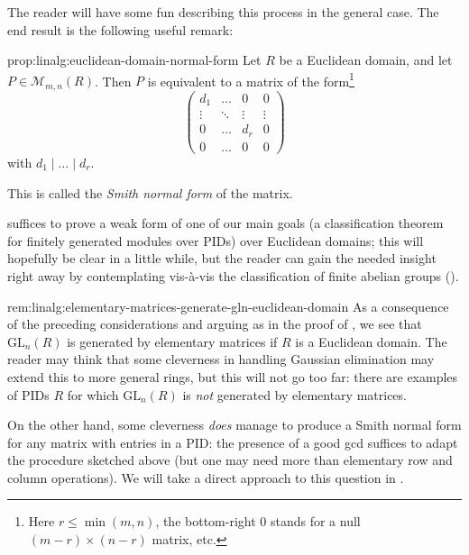 The reader will have some fun describing this process in the general
case. The end result is the following useful remark:
\begin{prop}{}{prop:linalg:euclidean-domain-normal-form}
  Let $R$ be a Euclidean domain, and let $P \in \mathcal{M}_{m,n}(R)$.
  Then $P$ is equivalent to a matrix of the form\footnote{Here
    $r \leq \min(m,n)$, the bottom-right $0$ stands for a null
    $(m-r) \times (n-r)$ matrix, etc.}
  \[
    \left(
      \begin{array}{ccc|c}
        d_1 & \dots & 0 & 0 \\
        \vdots & \ddots & \vdots & \vdots \\
        0 & \dots & d_r & 0 \\
        \hline
        0 & \dots & 0 & 0
      \end{array}
    \right)
  \]
  with $d_1 \mid \dots \mid d_r$.
\end{prop}
This is called the \emph{Smith normal form} of the matrix.

 suffices to prove a weak form of one of our main
goals (a classification theorem for finitely generated modules over
PIDs) over Euclidean domains; this will hopefully be clear in a little
while, but the reader can gain the needed insight right away by
contemplating  vis-\`{a}-vis the classification of
finite abelian groups
().

\begin{rem}{}{rem:linalg:elementary-matrices-generate-gln-euclidean-domain}
  As a consequence of the preceding considerations and arguing as in
  the proof of , we see that $\mathrm{GL}_n(R)$ is
  generated by elementary matrices if $R$ is a Euclidean domain. The
  reader may think that some cleverness in handling Gaussian
  elimination may extend this to more general rings, but this will not
  go too far: there are examples of PIDs $R$ for which
  $\mathrm{GL}_n(R)$ is \emph{not} generated by elementary matrices.

  On the other hand, some cleverness \emph{does} manage to produce a
  Smith normal form for any matrix with entries in a PID: the presence
  of a good gcd suffices to adapt the procedure sketched above (but
  one may need more than elementary row and column operations). We
  will take a direct approach to this question in
  .
\end{rem}

